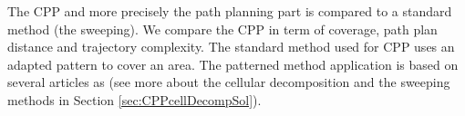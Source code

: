 The CPP and more precisely the path planning part is compared to a standard method (the sweeping). We compare the CPP  in term of coverage, path plan distance and trajectory complexity. The standard method used for CPP uses an adapted pattern to cover an area. The patterned method application is based on several articles as \citep{144*torres2016,191*di2016,63*chao2008,66*galceran2013,119*choset1998} (see more about the cellular decomposition and the sweeping methods in Section \ref{sec:CPPcellDecompSol}). %

